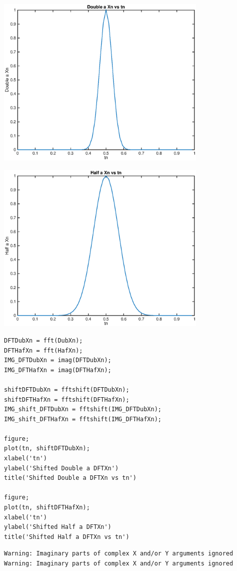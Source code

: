 \documentclass{article}
\begin{document}
\includegraphics [width=4in]{untitled_06.eps}

\includegraphics [width=4in]{untitled_07.eps}
\begin{verbatim}
DFTDubXn = fft(DubXn);
DFTHafXn = fft(HafXn);
IMG_DFTDubXn = imag(DFTDubXn);
IMG_DFTHafXn = imag(DFTHafXn);

shiftDFTDubXn = fftshift(DFTDubXn);
shiftDFTHafXn = fftshift(DFTHafXn);
IMG_shift_DFTDubXn = fftshift(IMG_DFTDubXn);
IMG_shift_DFTHafXn = fftshift(IMG_DFTHafXn);

figure;
plot(tn, shiftDFTDubXn);
xlabel('tn')
ylabel('Shifted Double a DFTXn')
title('Shifted Double a DFTXn vs tn')

figure;
plot(tn, shiftDFTHafXn);
xlabel('tn')
ylabel('Shifted Half a DFTXn')
title('Shifted Half a DFTXn vs tn')
\end{verbatim}

        \color{lightgray} \begin{verbatim}Warning: Imaginary parts of complex X and/or Y arguments ignored 
Warning: Imaginary parts of complex X and/or Y arguments ignored 
\end{verbatim} \color{black}
    
\end{document}
